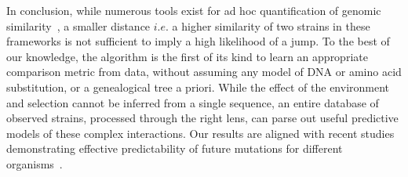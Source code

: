 \documentclass[onecolumn, compsoc,10pt]{IEEEtran}
\begin{document}



In conclusion, while numerous tools exist for ad hoc quantification of genomic similarity~\cite{posada1998modeltest,goldberger2005genomic,huelsenbeck1997phylogeny,neher2014predicting,VanderMeer2010,Smith2009}, a smaller  distance $i.e.$ a higher similarity of two strains in  these frameworks is not sufficient to imply a high likelihood of a jump. %
To the best of our knowledge, the \enet algorithm is  the first of its kind to learn an appropriate comparison metric from data, without assuming any model of DNA or amino acid substitution, or a genealogical tree a priori. While the effect of the environment and selection cannot be inferred from a single sequence, an entire database of observed strains, processed through the right lens, can parse out useful predictive models of these complex interactions. Our results are  aligned with recent studies demonstrating effective  predictability of  future mutations  for different organisms~\cite{mollentze2021identifying,maher2021predicting}.
   
\end{document}
